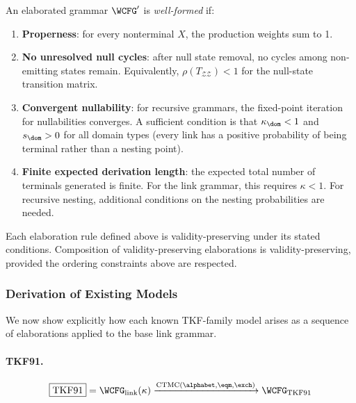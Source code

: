 \begin{definition}
An elaborated grammar $\WCFG'$ is \emph{well-formed} if:
\begin{enumerate}
\item \textbf{Properness}: for every nonterminal $X$,
  the production weights sum to 1.
\item \textbf{No unresolved null cycles}: after null state removal,
  no cycles among non-emitting states remain.
  Equivalently, $\rho(T_{\mathcal{Z}\mathcal{Z}}) < 1$
  for the null-state transition matrix.
\item \textbf{Convergent nullability}: for recursive grammars,
  the fixed-point iteration for nullabilities converges.
  A sufficient condition is that $\kappa_\dom < 1$ and
  $s_\dom > 0$ for all domain types (every link has a positive
  probability of being terminal rather than a nesting point).
\item \textbf{Finite expected derivation length}: the expected
  total number of terminals generated is finite.
  For the link grammar, this requires $\kappa < 1$.
  For recursive nesting, additional conditions on the nesting
  probabilities are needed.
\end{enumerate}
\end{definition}

\begin{proposition}
Each elaboration rule defined above is validity-preserving
under its stated conditions.  Composition of validity-preserving
elaborations is validity-preserving, provided the ordering
constraints above are respected.
\end{proposition}

\subsubsection{Derivation of Existing Models}
\label{sec:derivations-appendix}

We now show explicitly how each known TKF-family model arises
as a sequence of elaborations applied to the base link grammar.

\paragraph{TKF91.}

\begin{equation*}
\boxed{\text{TKF91}} =
\WCFG_{\mathrm{link}}(\kappa)
\xrightarrow{\text{CTMC}(\alphabet, \eqm, \exch)}
\WCFG_{\mathrm{TKF91}}
\end{equation*}

